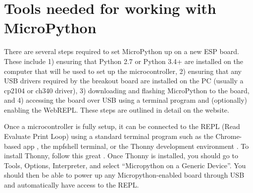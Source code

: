 \section{\color{gray} Tools needed for working with MicroPython\color{black}}

There are several steps required to set MicroPython up on a new ESP board.  These include 1) ensuring that Python 2.7 or Python 3.4+ are installed on the computer that will be used to set up the microcontroller, 2) ensuring that any USB drivers required by the breakout board are installed on the PC (usually a cp2104 or ch340 driver), 3) downloading and flashing MicroPython to the board, and 4) accessing the board over USB using a terminal program and (optionally) enabling the WebREPL.  These steps are outlined in detail on the   website.  

Once a microcontroller is fully setup, it can be connected to the REPL (Read Evaluate Print Loop) using a standard terminal program such as the Chrome-based app , the mpfshell terminal, or the Thonny development environment . To install Thonny, follow this great . Once Thonny is installed, you should go to Tools, Options, Interpreter, and select “Micropython on a Generic Device”.  You should then be able to power up any Micropython-enabled board through USB and automatically have access to the REPL.  


